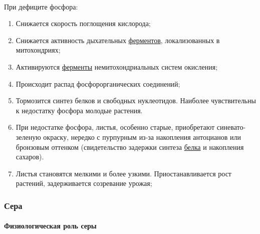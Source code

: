 \paragraph*{}При дефиците фосфора: 

\begin{enumerate}

	\item Снижается скорость поглощения кислорода;
	\item Снижается активность дыхательных \hyperlink{enzimes}{ферментов}, локализованных в митохондриях;
	\item Активируются \hyperlink{enzimes}{ферменты} немитохондриальных систем окисления; 
	\item Происходит распад фосфорорганических соединений;
	\item Тормозится синтез белков и свободных нуклеотидов. Наиболее чувствительны к недостатку фосфора молодые растения. 
	\item При недостатке фосфора, листья, особенно старые, приобретают синевато-зеленую окраску, нередко с пурпурным из-за накопления антоцианов или бронзовым оттенком (свидетельство задержки синтеза \hyperlink{proteins}{белка} и накопления сахаров). 
	\item Листья становятся мелкими и более узкими. Приостанавливается рост растений, задерживается созревание урожая;

\end{enumerate}

\subsubsection*{Сера}

\paragraph*{Физиологическая роль серы}

